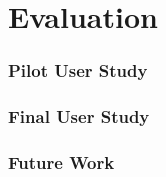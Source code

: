 \chapter{Evaluation}

\subsection{Pilot User Study}

\subsection{Final User Study}

\subsection{Future Work}

